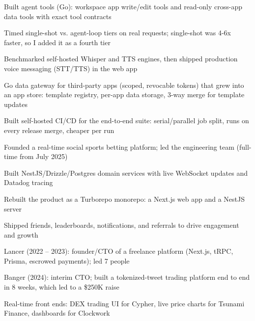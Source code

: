 \documentclass[print]{jack-resume}
\begin{document}
\begin{tightemize}
    \item Built agent tools (Go): workspace app write/edit tools and read-only cross-app data tools with exact tool contracts
    \item Timed single-shot vs. agent-loop tiers on real requests; single-shot was 4-6x faster, so I added it as a fourth tier
    \item Benchmarked self-hosted Whisper and TTS engines, then shipped production voice messaging (STT/TTS) in the web app
    \item Go data gateway for third-party apps (scoped, revocable tokens) that grew into an app store: template registry, per-app data storage, 3-way merge for template updates
    \item Built self-hosted CI/CD for the end-to-end suite: serial/parallel job split, runs on every release merge, cheaper per run
\end{tightemize}
\sectionsep

\begin{tightemize}
    \item Founded a real-time social sports betting platform; led the engineering team (full-time from July 2025)
    \item Built NestJS/Drizzle/Postgres domain services with live WebSocket updates and Datadog tracing
    \item Rebuilt the product as a Turborepo monorepo: a Next.js web app and a NestJS server
    \item Shipped friends, leaderboards, notifications, and referrals to drive engagement and growth
\end{tightemize}
\sectionsep

\begin{tightemize}
    \item Lancer (2022 -- 2023): founder/CTO of a freelance platform (Next.js, tRPC, Prisma, escrowed payments); led 7 people
    \item Banger (2024): interim CTO; built a tokenized-tweet trading platform end to end in 8 weeks, which led to a \$250K raise
    \item Real-time front ends: DEX trading UI for Cypher, live price charts for Tsunami Finance, dashboards for Clockwork
\end{tightemize}
\sectionsep
\end{document}

